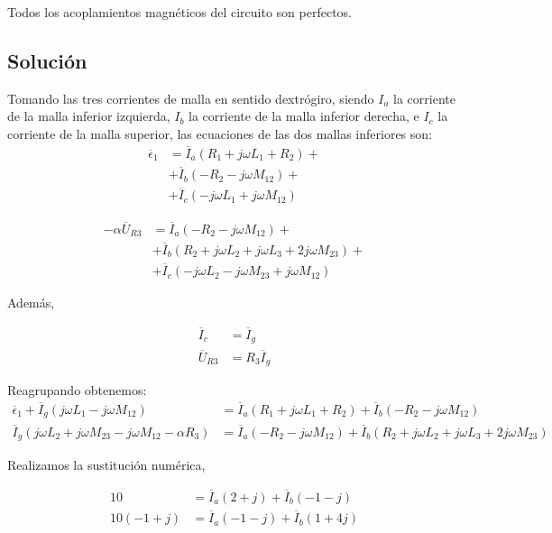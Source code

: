 \documentclass[12pt]{article}
\begin{document}
Todos los acoplamientos magnéticos del circuito son perfectos.

\subsection*{Solución}
Tomando las tres corrientes de malla en sentido dextrógiro, siendo $I_a$ la corriente de la malla inferior izquierda, $I_b$ la corriente de la malla inferior derecha, e $I_c$ la corriente de la malla superior, las ecuaciones de las dos mallas inferiores son:
\begin{align*}
  \overline{\epsilon}_1 &= \overline{I}_a (R_1 + j \omega L_1 + R_2) + \\
                        &+ \overline{I}_b (-R_2 - j \omega M_{12}) +\\
                        &+ \overline{I}_c (-j \omega L_1 + j \omega M_{12})
\end{align*}

\begin{align*}
  - \alpha \overline{U}_{R3} &= \overline{I}_a (-R_2 - j \omega M_{12}) + \\
                        &+ \overline{I}_b (R_2 + j\omega L_2 + j\omega L_3 + 2j\omega M_{23}) +\\
                        &+ \overline{I}_c (-j \omega L_2 - j \omega M_{23} + j\omega M_{12})
\end{align*}

Además,

\begin{align*}
  \overline{I}_c &= \overline{I}_g\\
  \overline{U}_{R3} &= R_3 \overline{I}_g
\end{align*}

Reagrupando obtenemos:
\begin{align*}
  \overline{\epsilon}_1 + \overline{I}_g (j \omega L_1 - j \omega M_{12}) &= \overline{I}_a (R_1 + j \omega L_1 + R_2) + \overline{I}_b (-R_2 - j \omega M_{12})\\
  \overline{I}_g (j \omega L_2 + j \omega M_{23} - j\omega M_{12} - \alpha R_3) &= \overline{I}_a (-R_2 - j \omega M_{12}) + \overline{I}_b (R_2 + j\omega L_2 + j\omega L_3 + 2j\omega M_{23})
\end{align*}

Realizamos la sustitución numérica, 

\begin{align*}
  10 &= \overline{I}_a (2 + j) + \overline{I}_b (-1 - j)\\
  10 (-1 + j) &= \overline{I}_a (-1 - j) + \overline{I}_b (1 + 4j)
\end{align*}
\end{document}
